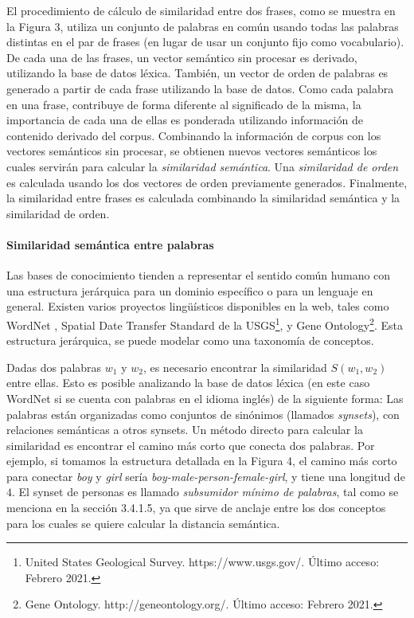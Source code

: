 El procedimiento de cálculo de similaridad entre dos frases, como se muestra en la Figura 3, utiliza un conjunto de palabras en común usando todas las palabras distintas en el par de frases (en lugar de usar un conjunto fijo como vocabulario). De cada una de las frases, un vector semántico sin procesar es derivado, utilizando la base de datos léxica. También, un vector de orden de palabras es generado a partir de cada frase utilizando la base de datos. Como cada palabra en una frase, contribuye de forma diferente al significado de la misma, la importancia de cada una de ellas es ponderada utilizando información de contenido derivado del corpus. Combinando la información de corpus con los vectores semánticos sin procesar, se obtienen nuevos vectores semánticos los cuales servirán para calcular la \textit{similaridad semántica}. Una \textit{similaridad de orden} es calculada usando los dos vectores de orden previamente generados. Finalmente, la similaridad entre frases es calculada combinando la similaridad semántica y la similaridad de orden.

\paragraph{Similaridad semántica entre palabras}
Las bases de conocimiento tienden a representar el sentido común humano con una estructura jerárquica para un dominio específico o para un lenguaje en general. Existen varios proyectos lingüísticos disponibles en la web, tales como WordNet \citep{miller1995wordnet}, Spatial Date Transfer Standard de la USGS\footnote{United States Geological Survey. https://www.usgs.gov/. Último acceso: Febrero 2021.}, y Gene Ontology\footnote{Gene Ontology. http://geneontology.org/. Último acceso: Febrero 2021.}. Esta estructura jerárquica, se puede modelar como una taxonomía de conceptos.

\bigskip Dadas dos palabras \(w_1\) y \(w_2\), es necesario encontrar la similaridad \(S(w_1,w_2)\) entre ellas. Esto es posible analizando la base de datos léxica (en este caso WordNet si se cuenta con palabras en el idioma inglés) de la siguiente forma: Las palabras están organizadas como conjuntos de sinónimos (llamados \textit{synsets}), con relaciones semánticas a otros synsets. Un método directo para calcular la similaridad es encontrar el camino más corto que conecta dos palabras. Por ejemplo, si tomamos la estructura detallada en la Figura 4, el camino más corto para conectar \textit{boy} y \textit{girl} sería \textit{boy-male-person-female-girl}, y tiene una longitud de \(4\). El synset de personas es llamado \textit{subsumidor mínimo de palabras}, tal como se menciona en la sección 3.4.1.5, ya que sirve de anclaje entre los dos conceptos para los cuales se quiere calcular la distancia semántica.

